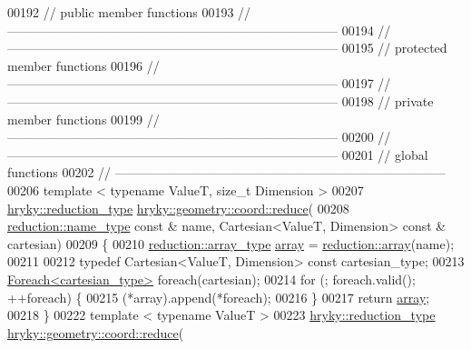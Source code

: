 \begin{DoxyCode}
00192 \textcolor{comment}{// public member functions}
00193 \textcolor{comment}{//
      ------------------------------------------------------------------------------}
00194 \textcolor{comment}{//
      ------------------------------------------------------------------------------}
00195 \textcolor{comment}{// protected member functions}
00196 \textcolor{comment}{//
      ------------------------------------------------------------------------------}
00197 \textcolor{comment}{//
      ------------------------------------------------------------------------------}
00198 \textcolor{comment}{// private member functions}
00199 \textcolor{comment}{//
      ------------------------------------------------------------------------------}
00200 \textcolor{comment}{//
      ------------------------------------------------------------------------------}
00201 \textcolor{comment}{// global functions}
00202 \textcolor{comment}{//
      ------------------------------------------------------------------------------}
00206 \textcolor{comment}{}\textcolor{keyword}{template} < \textcolor{keyword}{typename} ValueT, \textcolor{keywordtype}{size\_t} Dimension >
00207 \hyperlink{classhryky_1_1_intrusive_ptr}{hryky::reduction_type} \hyperlink{namespacehryky_1_1geometry_a18354ece30244aa68fc3744f2cdb41fc}{hryky::geometry::coord::reduce}(
00208     \hyperlink{classhryky_1_1reduction_1_1_string}{reduction::name_type} \textcolor{keyword}{const} & name, Cartesian<ValueT, Dimension> \textcolor{keyword}{const} & 
      cartesian)
00209 \{
00210     \hyperlink{classhryky_1_1_intrusive_ptr}{reduction::array_type} \hyperlink{namespacehryky_1_1reduction_a9d45a4dc1ea9a6668ebd192f296f788c}{array} = \hyperlink{namespacehryky_1_1reduction_a9d45a4dc1ea9a6668ebd192f296f788c}{reduction::array}(name);
00211 
00212     \textcolor{keyword}{typedef} Cartesian<ValueT, Dimension> \textcolor{keyword}{const} cartesian\_type;
00213     \hyperlink{classhryky_1_1_foreach}{Foreach<cartesian_type>} \textcolor{keywordflow}{foreach}(cartesian);
00214     \textcolor{keywordflow}{for} (; \textcolor{keywordflow}{foreach}.valid(); ++\textcolor{keywordflow}{foreach}) \{
00215         (*array).append(*\textcolor{keywordflow}{foreach});
00216     \}
00217     \textcolor{keywordflow}{return} \hyperlink{namespacehryky_1_1reduction_a9d45a4dc1ea9a6668ebd192f296f788c}{array};
00218 \}
00222 \textcolor{keyword}{template} < \textcolor{keyword}{typename} ValueT >
00223 \hyperlink{classhryky_1_1_intrusive_ptr}{hryky::reduction_type} \hyperlink{namespacehryky_1_1geometry_a18354ece30244aa68fc3744f2cdb41fc}{hryky::geometry::coord::reduce}(

\end{DoxyCode}
